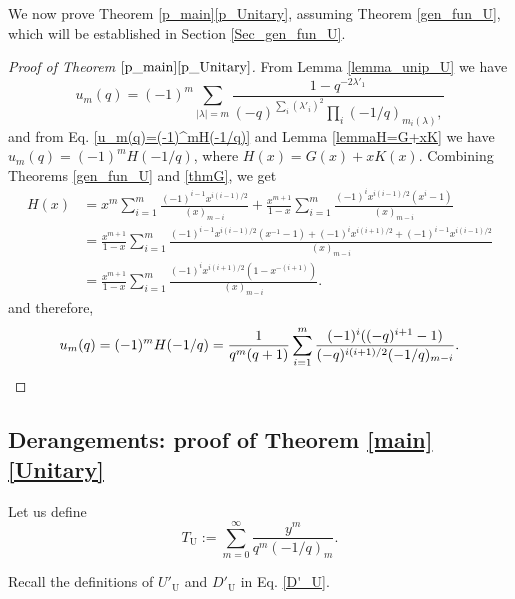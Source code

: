 \documentclass[a4paper, 12pt, oneside]{amsart}
\theoremstyle{definition}
\DeclareMathOperator{\U}{U}
\begin{document}
We now prove Theorem \ref{p_main}\eqref{p_Unitary}, assuming Theorem \ref{gen_fun_U}, which will be established in Section \ref{Sec_gen_fun_U}.
\begin{proof}[Proof of Theorem $\ref{p_main}\eqref{p_Unitary}$]
From Lemma \ref{lemma_unip_U} we have
 $$u_m(q)=(-1)^m\sum_{|\lambda|=m}\frac{1-q^{-2\lambda'_1}}{(-q)^{\sum_{i}(\lambda'_i)^2}\prod_i(-1/q)_{m_i(\lambda)},}$$
 and from Eq. \eqref{u_m(q)=(-1)^mH(-1/q)} and Lemma \ref{lemmaH=G+xK} we have $u_m(q)=(-1)^mH(-1/q)$, where $H(x)=G(x)+xK(x)$. Combining Theorems \ref{gen_fun_U} and \ref{thmG}, we get
 \begin{align*}
 H(x)&=x^m\sum_{i=1}^{m}\frac{(-1)^{i-1}x^{i(i-1)/2}}{(x)_{m-i}}+
 \frac{x^{m+1}}{1-x}\sum_{i=1}^{m}\frac{(-1)^{i}x^{i(i-1)/2}(x^i-1)}{(x)_{m-i}} \\
 &=\frac{x^{m+1}}{1-x}\sum_{i=1}^{m}\frac{(-1)^{i-1}x^{i(i-1)/2}(x^{-1}-1)+(-1)^{i}x^{i(i+1)/2}+(-1)^{i-1}x^{i(i-1)/2}}{(x)_{m-i}} \\
 &=\frac{x^{m+1}}{1-x}\sum_{i=1}^m\frac{(-1)^{i}x^{i(i+1)/2}(1-x^{-(i+1)})}{(x)_{m-i}}.
 \end{align*}
 and therefore,
 \begin{equation*}
 u_m(q)=(-1)^mH(-1/q)=\frac{1}{q^m(q+1)}\sum_{i=1}^m\frac{(-1)^i((-q)^{i+1}-1)}{(-q)^{i(i+1)/2}(-1/q)_{m-i}}. \qedhere
  \end{equation*}
\end{proof} 
\subsection{Derangements: proof of Theorem \ref{main}\eqref{Unitary}}
Let us define
$$T_{\U}:=\sum_{m=0}^{\infty}\frac{y^m}{q^m(-1/q)_m}.$$


Recall the definitions of $U'_{\U}$ and $D'_{\U}$ in Eq. \eqref{D'_U}.
\end{document}
